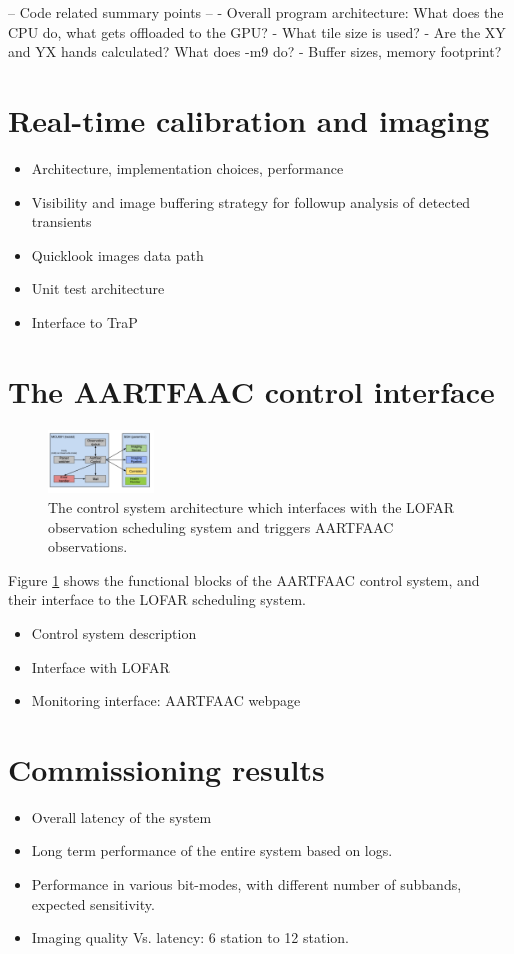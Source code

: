 \documentclass{ws-jai}
\begin{document}
-- Code related summary points --
- Overall program architecture: What does the CPU do, what gets offloaded to the GPU?
- What tile size is used?
- Are the XY and YX hands calculated? What does -m9 do?
- Buffer sizes, memory footprint?


\section {\label{sec:calim} Real-time calibration and imaging}
\begin {itemize}
 \item {Architecture, implementation choices, performance}
 \item  {Visibility  and  image  buffering strategy  for  followup  analysis  of
   detected transients}
 \item {Quicklook images data path}
 \item {Unit test architecture}
 \item {Interface to TraP}
\end {itemize}

\section {\label{sec:acontrol} The AARTFAAC control interface}
\begin{figure}[htbp]
\centering
\includegraphics[width=0.25\textwidth]{Figs/control_sys.png}
\caption{The  control  system  architecture  which  interfaces  with  the  LOFAR
  observation scheduling system and triggers AARTFAAC observations.}
\label{fig:afaac_ctrl_sys}
\end{figure}
Figure  \ref{fig:afaac_ctrl_sys} shows  the  functional blocks  of the  AARTFAAC
control system, and their interface to the LOFAR scheduling system.
\begin {itemize}
 \item {Control system description}
 \item {Interface with LOFAR}
 \item {Monitoring interface: AARTFAAC webpage}
\end {itemize}

\section {\label{sec:results} Commissioning results}
\begin {itemize}
 \item {Overall latency of the system}
 \item {Long term performance of the entire system based on logs.}
 \item {Performance  in various  bit-modes, with  different number  of subbands,
   expected sensitivity.}
 \item {Imaging quality Vs. latency: 6 station to 12 station.}
\end {itemize}
\end{document}
